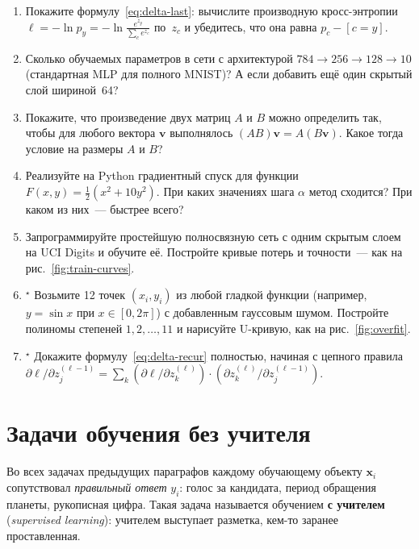 \begin{tasksbox}
\begin{enumerate}\itemsep1pt
  \item Покажите формулу~\eqref{eq:delta-last}: вычислите производную
        кросс-энтропии $\ell=-\ln p_y=-\ln\frac{e^{z_y}}{\sum_c e^{z_c}}$
        по~$z_c$ и убедитесь, что она равна $p_c-[c=y]$.
  \item Сколько обучаемых параметров в сети с архитектурой
        $784\to 256\to 128\to 10$ (стандартная MLP для полного MNIST)?
        А если добавить ещё один скрытый слой шириной~64?
  \item Покажите, что произведение двух матриц $A$ и $B$ можно
        определить так, чтобы для любого вектора $\mathbf v$ выполнялось
        $(AB)\mathbf v=A(B\mathbf v)$. Какое тогда условие на размеры
        $A$ и $B$?
  \item Реализуйте на Python градиентный спуск для функции
        $F(x,y)=\tfrac12(x^{2}+10y^{2})$. При каких значениях шага
        $\alpha$ метод сходится? При каком из них~--- быстрее всего?
  \item Запрограммируйте простейшую полносвязную сеть с одним скрытым
        слоем на UCI Digits и обучите её. Постройте кривые потерь и
        точности~--- как на рис.~\ref{fig:train-curves}.
  \item$^{\star}$ Возьмите 12 точек $(x_i,y_i)$ из любой гладкой
        функции (например, $y=\sin x$ при $x\in[0,2\pi]$) с
        добавленным гауссовым шумом. Постройте полиномы степеней
        $1,2,\dots,11$ и нарисуйте U-кривую, как на
        рис.~\ref{fig:overfit}.
  \item$^{\star}$ Докажите формулу~\eqref{eq:delta-recur} полностью,
        начиная с цепного правила
        $\partial\ell/\partial z^{(\ell-1)}_j=\sum_k (\partial\ell/\partial z^{(\ell)}_k)\cdot(\partial z^{(\ell)}_k/\partial z^{(\ell-1)}_j)$.
\end{enumerate}
\end{tasksbox}

\section{Задачи обучения без учителя}
\label{sec:unsup}

Во всех задачах предыдущих параграфов каждому обучающему объекту
$\mathbf x_i$ сопутствовал \emph{правильный ответ} $y_i$: голос за
кандидата, период обращения планеты, рукописная цифра. Такая задача
называется обучением \textbf{с учителем} (\emph{supervised learning}):
учителем выступает разметка, кем-то заранее проставленная.


